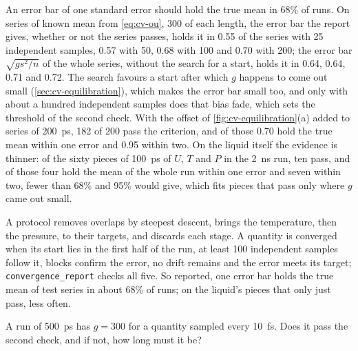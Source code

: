 An error bar of one standard error should hold the true mean in 68\% of
runs. On series of known mean from \cref{eq:cv-ou}, 300 of each length,
the error bar the report gives, whether or not the series passes, holds it
in 0.55 of the series with 25
independent samples, 0.57 with 50, 0.68 with 100 and 0.70 with 200; the
error bar $\sqrt{g s^2/n}$ of the whole series, without the search for a
start, holds it in 0.64, 0.64, 0.71 and 0.72. The search favours a start
after which $g$ happens to come out small (\cref{sec:cv-equilibration}),
which makes the error bar small too, and only with about a hundred
independent samples does that bias fade, which sets the threshold of the
second check. With the offset of \cref{fig:cv-equilibration}(a) added to
series of \SI{200}{\pico\second}, 182 of 200 pass the criterion, and of
those 0.70 hold the true mean within one error and 0.95 within two. On the
liquid itself the evidence is thinner: of the sixty pieces of
\SI{100}{\pico\second} of $U$, $T$ and $P$ in the \SI{2}{\nano\second} run,
ten pass, and of those four hold the mean of the whole run within one
error and seven within two, fewer than 68\% and 95\% would give, which
fits pieces that pass only where $g$ came out small.

\begin{keyidea}
A protocol removes overlaps by steepest descent, brings the temperature,
then the pressure, to their targets, and discards each stage. A quantity
is converged when its start lies in the first half of the run, at least
100 independent samples follow it, blocks confirm the error, no drift
remains and the error meets its target; \texttt{convergence\_report} checks
all five. So reported, one error bar holds the true mean of test series in
about 68\% of runs; on the liquid's pieces that only just pass, less
often.
\end{keyidea}


\begin{selfcheck}
A run of \SI{500}{\pico\second} has $g = 300$ for a quantity sampled every
\SI{10}{\femto\second}. Does it pass the second check, and if not, how long
must it be?
\end{selfcheck}
